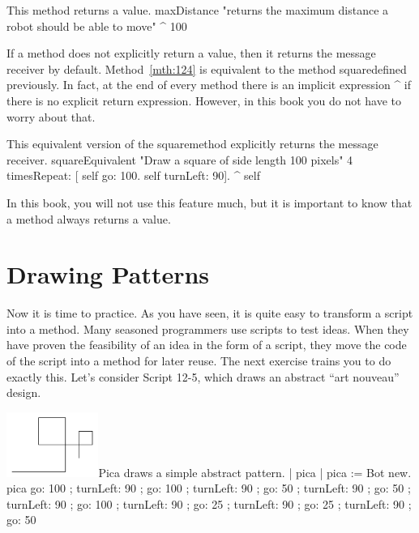 \documentclass[a4paper,10pt,twoside]{book}
\begin{document}
\begin{method}[123]{This method returns a value.}
maxDistance
	"returns the maximum distance a robot should be able to move" 
	^ 100 
\end{method}

If a method does not explicitly return a value, then it returns the message receiver by 
default. Method~\ref{mth:124} is equivalent to the method squaredefined previously. In fact, at the end 
of every method there is an implicit expression \textasciicircum {} if there is no explicit return expression. 
However, in this book you do not have to worry about that. 

\begin{method}[124]{This equivalent version of the squaremethod explicitly returns the message receiver.}
squareEquivalent 
	"Draw a square of side length 100 pixels" 
	4 timesRepeat: 
		[ self go: 100. 
		self turnLeft: 90]. 
	^ self 
\end{method}

In this book, you will not use this feature much, but it is important to know that a method 
always returns a value. 


\section{Drawing Patterns} 

Now it is time to practice. As you have seen, it is quite easy to transform a script into a 
method. Many seasoned programmers use scripts to test ideas. When they have proven the 
feasibility of an idea in the form of a script, they move the code of the script into a method for 
later reuse. The next exercise trains you to do exactly this. Let’s consider Script 12-5, which 
draws an abstract ``art nouveau'' design. 

\begin{scriptfigwithsize}[0.4]{\includegraphics[width=3cm]{artNouveauScr}}{Pica draws a simple abstract pattern.}\label{scr:125}
| pica | 
pica := Bot new. 
pica go: 100 ; 
	turnLeft: 90 ; 
	go: 100 ; 
	turnLeft: 90 ; 
	go: 50 ; 
	turnLeft: 90 ; 
	go: 50 ; 
	turnLeft: 90 ; 
	go: 100 ; 
	turnLeft: 90 ; 
	go: 25 ; 
	turnLeft: 90 ; 
	go: 25 ; 
	turnLeft: 90 ; 
	go: 50 
\end{scriptfigwithsize} 
\end{document}
